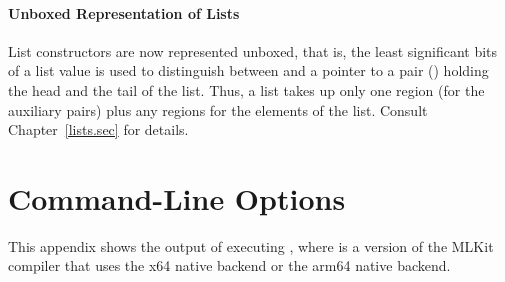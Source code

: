 \documentclass[12pt]{book}
\begin{document}
\subsubsection*{Unboxed Representation of Lists}
 List constructors are now represented unboxed, that is, the least
significant bits of a list value is used to distinguish between  and a
pointer to a pair (\kw{::}) holding the head and the tail of the list. Thus, a
list takes up only one region (for the auxiliary pairs) plus any regions for the
elements of the list. Consult Chapter~\ref{lists.sec} for details.

\nocite{total97,total94,btv96,elshal95,KochHojfeld96,H96,hallenberg99,brtt93,hosc-regions2004}




\appendix

\chapter{Command-Line Options}
\label{mlkithelp.app}
This appendix shows the output of executing
%
%
%
, where  is a version of the MLKit compiler that
uses the
%
%
%
x64 native backend or the arm64 native backend.
\end{document}
